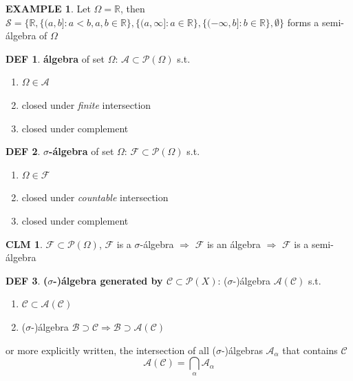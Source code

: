 \documentclass[hidelinks]{article}
\theoremstyle{definition}
\newtheorem*{defin}{DEF}
\newtheorem*{eg}{EXAMPLE}
\theoremstyle{dotless}
\newtheorem{claim}{CLM}[section]
\theoremstyle{remark}
\begin{document}
\begin{eg}
Let $\Omega=\mathbb{R}$, then $\mathscr{S}=\{\mathbb{R},\{(a,b]:a<b,a,b\in \mathbb{R}\},\{(a,\infty]:a\in \mathbb{R}\},\{(-\infty,b]:b\in\mathbb{R}\},\emptyset\}$ forms a semi-álgebra of $\Omega$
\end{eg}

\begin{defin}
\textbf{álgebra} of set $\Omega$:
$\mathscr{A}\subset\mathscr{P}(\Omega)$ s.t.
\begin{enumerate}[label=\arabic*\degree]
    \item $\Omega\in\mathscr{A}$
    \item closed under \emph{finite} intersection
    \item closed under complement
\end{enumerate}
\end{defin}

\begin{defin}
\textbf{$\sigma$-álgebra} of set $\Omega$:
$\mathscr{F}\subset\mathscr{P}(\Omega)$ s.t.
\begin{enumerate}[label=\arabic*\degree]
    \item $\Omega\in\mathscr{F}$
    \item closed under \emph{countable} intersection
    \item closed under complement
\end{enumerate}
\end{defin}

\begin{claim}
$\mathscr{F}\subset\mathscr{P}(\Omega)$, $\mathscr{F}$ is a $\sigma$-álgebra $\Rightarrow$ $\mathscr{F}$ is an álgebra $\Rightarrow$ $\mathscr{F}$ is a semi-álgebra
\end{claim}

\begin{defin}
\textbf{($\sigma$-)álgebra generated by $\mathscr{C}\subset\mathscr{P}(X)$}: ($\sigma$-)álgebra $\mathscr{A}(\mathscr{C})$ s.t.
\begin{enumerate}[label=\arabic*\degree]
    \item $\mathscr{C}\subset\mathscr{A}(\mathscr{C})$
    \item ($\sigma$-)álgebra $\mathscr{B}\supset\mathscr{C}\Rightarrow\mathscr{B}\supset\mathscr{A}(\mathscr{C})$
\end{enumerate}
or more explicitly written, the intersection of all ($\sigma$-)álgebras $\mathscr{A}_\alpha$ that contains $\mathscr{C}$
\[\mathscr{A}(\mathscr{C})=\bigcap\limits_\alpha\mathscr{A}_\alpha\]
\end{defin}
\end{document}
